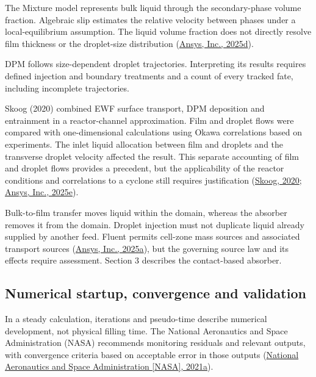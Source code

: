 \documentclass[12pt]{article}
\begin{document}
The Mixture model represents bulk liquid through the secondary-phase volume fraction. Algebraic slip estimates the relative velocity between phases under a local-equilibrium assumption. The liquid volume fraction does not directly resolve film thickness or the droplet-size distribution (\href{https://ansyshelp.ansys.com/public/Views/Secured/corp/v252/en/flu_th/flu_th_sec_drift_oview.html}{Ansys, Inc., 2025d}).

DPM follows size-dependent droplet trajectories. Interpreting its results requires defined injection and boundary treatments and a count of every tracked fate, including incomplete trajectories.

Skoog (2020) combined EWF surface transport, DPM deposition and entrainment in a reactor-channel approximation. Film and droplet flows were compared with one-dimensional calculations using Okawa correlations based on experiments. The inlet liquid allocation between film and droplets and the transverse droplet velocity affected the result. This separate accounting of film and droplet flows provides a precedent, but the applicability of the reactor conditions and correlations to a cyclone still requires justification (\href{https://www.diva-portal.org/smash/get/diva2:1452100/FULLTEXT02.pdf}{Skoog, 2020}; \href{https://ansyshelp.ansys.com/public/views/secured/corp/v252/en/flu_ug/flu_ug_models_wallfilm.html}{Ansys, Inc., 2025e}).

Bulk-to-film transfer moves liquid within the domain, whereas the absorber removes it from the domain. Droplet injection must not duplicate liquid already supplied by another feed. Fluent permits cell-zone mass sources and associated transport sources (\href{https://ansyshelp.ansys.com/public/Views/Secured/corp/v252/en/flu_ug/flu_ug_bcs_sec_cell_zones.html}{Ansys, Inc., 2025a}), but the governing source law and its effects require assessment. Section 3 describes the contact-based absorber.

\subsection{Numerical startup, convergence and validation}\label{numerical-startup-convergence-and-validation}

In a steady calculation, iterations and pseudo-time describe numerical development, not physical filling time. The National Aeronautics and Space Administration (NASA) recommends monitoring residuals and relevant outputs, with convergence criteria based on acceptable error in those outputs (\href{https://www.grc.nasa.gov/www/wind/valid/tutorial/iterconv.html}{National Aeronautics and Space Administration {[}NASA{]}, 2021a}).
\end{document}
